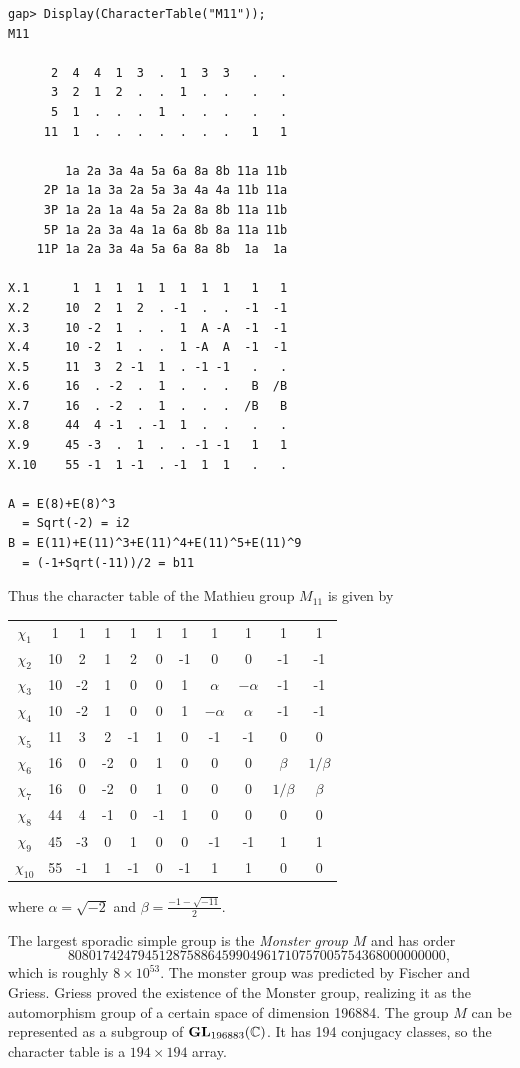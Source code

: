 \begin{lstlisting}
gap> Display(CharacterTable("M11"));
M11

      2  4  4  1  3  .  1  3  3   .   .
      3  2  1  2  .  .  1  .  .   .   .
      5  1  .  .  .  1  .  .  .   .   .
     11  1  .  .  .  .  .  .  .   1   1

        1a 2a 3a 4a 5a 6a 8a 8b 11a 11b
     2P 1a 1a 3a 2a 5a 3a 4a 4a 11b 11a
     3P 1a 2a 1a 4a 5a 2a 8a 8b 11a 11b
     5P 1a 2a 3a 4a 1a 6a 8b 8a 11a 11b
    11P 1a 2a 3a 4a 5a 6a 8a 8b  1a  1a

X.1      1  1  1  1  1  1  1  1   1   1
X.2     10  2  1  2  . -1  .  .  -1  -1
X.3     10 -2  1  .  .  1  A -A  -1  -1
X.4     10 -2  1  .  .  1 -A  A  -1  -1
X.5     11  3  2 -1  1  . -1 -1   .   .
X.6     16  . -2  .  1  .  .  .   B  /B
X.7     16  . -2  .  1  .  .  .  /B   B
X.8     44  4 -1  . -1  1  .  .   .   .
X.9     45 -3  .  1  .  . -1 -1   1   1
X.10    55 -1  1 -1  . -1  1  1   .   .

A = E(8)+E(8)^3
  = Sqrt(-2) = i2
B = E(11)+E(11)^3+E(11)^4+E(11)^5+E(11)^9
  = (-1+Sqrt(-11))/2 = b11
\end{lstlisting}

Thus the character table of the Mathieu group $M_{11}$ is
given by
\begin{center}
		\begin{tabular}{|c|cccccccccc|}
			\hline
			$\chi_{1}$ & 1 & 1 & 1 & 1 & 1 & 1 & 1 & 1 & 1 & 1\tabularnewline
			$\chi_{2}$ & 10 & 2 & 1 & 2 & 0 & -1 & 0 & 0 & -1 & -1 \tabularnewline
			$\chi_{3}$ & 10 & -2 & 1 & 0 & 0 & 1 & $\alpha$ & $-\alpha$ & -1 & -1\tabularnewline
		    $\chi_{4}$ & 10 & -2 & 1 & 0 & 0 & 1 & $-\alpha$ & $\alpha$ & -1 & -1\tabularnewline
		    $\chi_{5}$ & 11 & 3 & 2 &-1 & 1 & 0 & -1 & -1 & 0 & 0\tabularnewline
			$\chi_{6}$ & 16 & 0 & -2 & 0 & 1 & 0 & 0 & 0 & $\beta$ & $1/\beta$\tabularnewline
			$\chi_{7}$ & 16 & 0 & -2 & 0 & 1 & 0 & 0 & 0 & $1/\beta$ & $\beta$\tabularnewline
			$\chi_{8}$ & 44 & 4 &-1 & 0 &-1 & 1 & 0 & 0 & 0 & 0\tabularnewline
			$\chi_{9}$ & 45 & -3 & 0 & 1 & 0 & 0 &-1 &-1 &  1 & 1\tabularnewline
			$\chi_{10}$ & 55 & -1 & 1 & -1 & 0 & -1 & 1 & 1 & 0 & 0\tabularnewline
			\hline
		\end{tabular}    
\end{center}
where $\alpha=\sqrt{-2}$ and $\beta=\frac{-1-\sqrt{-11}}{2}$. 

The largest sporadic simple group is the \emph{Monster group} $M$ and has order
\[
808017424794512875886459904961710757005754368000000000, 
\]
which is roughly $8\times 10^{53}$. 
The monster group was predicted by Fischer and Griess. 
Griess proved the existence of the Monster group, realizing it as
the automorphism group of a certain space of dimension 196884. 
The group $M$ can be represented as
a subgroup of $\mathbf{GL}_{196883}(\mathbb{C})$. It has 194 conjugacy classes, so 
the character table is a $194\times 194$ array. 

